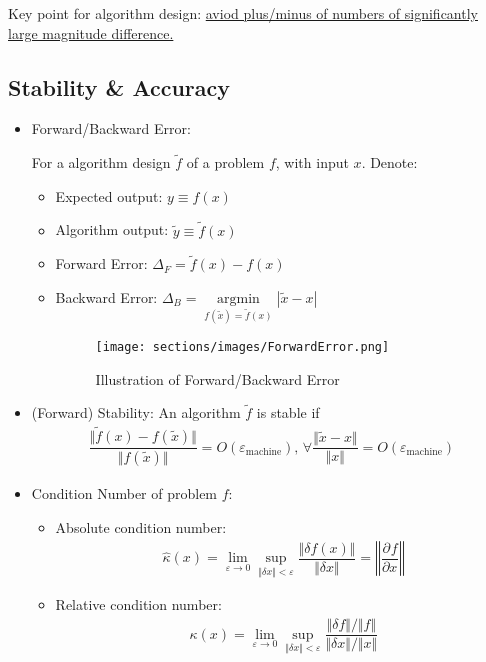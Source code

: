     Key point for algorithm design: \uline{aviod plus/minus of numbers of significantly large magnitude difference.}
    
\subsection{Stability \& Accuracy} 

\begin{itemize}[topsep=2pt,itemsep=0pt]
    \item Forward/Backward Error:
    
    For a algorithm design $ \tilde{f} $ of a problem $ f $, with input $ x $. Denote:
\begin{itemize}[topsep=2pt,itemsep=0pt]
    \item Expected output: $ y\equiv f(x) $
    \item Algorithm output: $ \tilde{y}\equiv \tilde{f}(x) $
    \item Forward Error: $ \Delta _F=\tilde{f}(x)-f(x) $
    \item Backward Error: $ \Delta _B=\mathop{\arg\min}\limits_{f(\tilde{x})=\tilde{f}(x)} |\tilde{x}-x|  $
\begin{figure}[H]
    \centering
    \texttt{[image: sections/images/ForwardError.png]}
    \caption{Illustration of Forward/Backward Error}
\end{figure}

\end{itemize}
    \item (Forward) Stability: An algorithm $ \tilde{f} $ is stable if 
    \begin{align}
        \dfrac{\Vert \tilde{f}(x)-f(\tilde{x})\Vert }{\Vert f(\tilde{x})\Vert }=O(\varepsilon _\mathrm{machine} ),\,\forall \dfrac{\Vert \tilde{x}-x\Vert }{\Vert x\Vert }=O(\varepsilon _\mathrm{machine} ) 
    \end{align}
    \item Condition Number of problem $ f $:
    \begin{itemize}[topsep=2pt,itemsep=0pt]
        \item Absolute condition number:
        \begin{align}
            \hat{\kappa }(x)=\lim_{\varepsilon \to 0}\mathop{\sup}\limits_{\Vert \delta x\Vert <\varepsilon }\dfrac{\Vert\delta f(x)\Vert}{\Vert\delta x\Vert}=\left\Vert \dfrac{\partial^{} f}{\partial x^{}}\right\Vert   
        \end{align}
        \item Relative condition number:
        \begin{align}
            \kappa (x)=\lim_{\varepsilon \to 0} \mathop{\sup}\limits_{\Vert \delta x\Vert <\varepsilon }\dfrac{\Vert \delta f\Vert \big/\Vert f\Vert }{\Vert \delta x\Vert \big/\Vert x\Vert }
        \end{align}
    \end{itemize}


\end{itemize}
